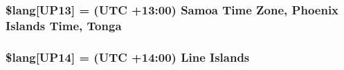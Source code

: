\subsubsection[{\$lang}]{\setlength{\rightskip}{0pt plus 5cm}\$lang\mbox{[}\textquotesingle{}U\+P13\textquotesingle{}\mbox{]} = \textquotesingle{}(U\+T\+C +13\+:00) Samoa Time Zone, Phoenix Islands Time, Tonga\textquotesingle{}}\label{system_2language_2english_2date__lang_8php_ac197fec09ff547ca12a7fe3ffc5908ae}
\hypertarget{system_2language_2english_2date__lang_8php_a50562230c497ebdba1f540d409110fce}{}
\subsubsection[{\$lang}]{\setlength{\rightskip}{0pt plus 5cm}\$lang\mbox{[}\textquotesingle{}U\+P14\textquotesingle{}\mbox{]} = \textquotesingle{}(U\+T\+C +14\+:00) Line Islands\textquotesingle{}}\label{system_2language_2english_2date__lang_8php_a50562230c497ebdba1f540d409110fce}
